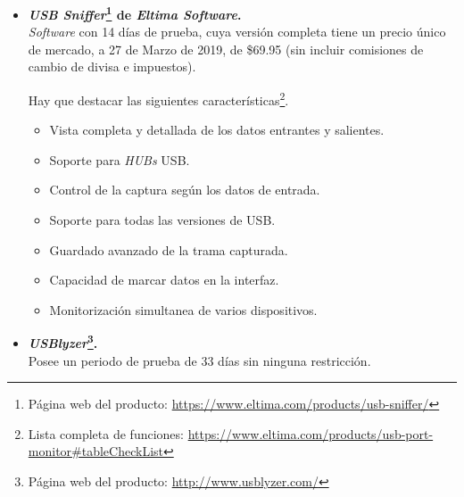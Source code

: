 \begin{itemize}
\begin{enumerate}
        \item \textbf{Edición \emph{ultimate}.} Incluye las ventajas de la edición \emph{professional}, añadiendo:
        \begin{itemize}
            \item Visor de paquetes USB en bruto.
            \item Monitorización simultanea de varios dispositivos.
            \item Scripts personalizados usando el lenguaje \emph{TypeSpript}.
        \end{itemize}
        Su precio, a 27 de Marzo de 2019, es de 159.99\texteuro para uso NO comercial y 224.99\texteuro para uso comercial.
    \end{enumerate}
    
    \item \textbf{\emph{USB Sniffer}\footnote{Página web del producto: \url{https://www.eltima.com/products/usb-sniffer/}} de \emph{Eltima Software}.} \\
    \emph{Software} con 14 días de prueba, cuya versión completa tiene un precio único de mercado, a 27 de Marzo de 2019, de \$69.95 (sin incluir comisiones de cambio de divisa e impuestos).
    
    Hay que destacar las siguientes características\footnote{Lista completa de funciones: \url{https://www.eltima.com/products/usb-port-monitor\#tableCheckList}}.

    \begin{itemize}
        \item Vista completa y detallada de los datos entrantes y salientes.
        \item Soporte para \emph{HUBs} USB.
        \item Control de la captura según los datos de entrada.
        \item Soporte para todas las versiones de USB.
        \item Guardado avanzado de la trama capturada.
        \item Capacidad de marcar datos en la interfaz.
        \item Monitorización simultanea de varios dispositivos.
    \end{itemize}
    
    \item \textbf{\emph{USBlyzer}\footnote{Página web del producto: \url{http://www.usblyzer.com/}}.} \\
    Posee un periodo de prueba de 33 días sin ninguna restricción.


\end{itemize}

